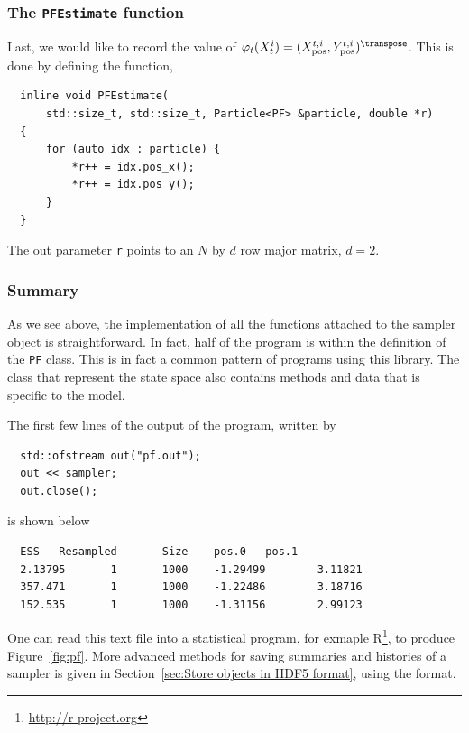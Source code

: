 \subsubsection{The \texttt{PFEstimate} function}

Last, we would like to record the value of $\varphi_t(X_t^i) =
(\xpos^{t,i},\ypos^{t,i})^{\transpose}$. This is done by defining the function,
\begin{Verbatim}
  inline void PFEstimate(
      std::size_t, std::size_t, Particle<PF> &particle, double *r)
  {
      for (auto idx : particle) {
          *r++ = idx.pos_x();
          *r++ = idx.pos_y();
      }
  }
\end{Verbatim}
The out parameter \verb|r| points to an $N$ by $d$ row major matrix, $d = 2$.

\subsubsection{Summary}

As we see above, the implementation of all the functions attached to the
sampler object is straightforward. In fact, half of the program is within the
definition of the \verb|PF| class. This is in fact a common pattern of programs
using this library. The class that represent the state space also contains
methods and data that is specific to the model.

The first few lines of the output of the program, written by
\begin{Verbatim}
  std::ofstream out("pf.out");
  out << sampler;
  out.close();
\end{Verbatim}
is shown below
\begin{Verbatim}
  ESS   Resampled       Size    pos.0   pos.1
  2.13795       1       1000    -1.29499        3.11821
  357.471       1       1000    -1.22486        3.18716
  152.535       1       1000    -1.31156        2.99123
\end{Verbatim}
One can read this text file into a statistical program, for exmaple
R\footnote{\url{http://r-project.org}}, to produce Figure~\ref{fig:pf}. More
advanced methods for saving summaries and histories of a sampler is given in
Section~\ref{sec:Store objects in HDF5 format}, using the \hdf format.

